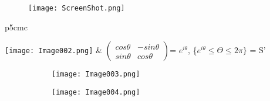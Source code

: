 \documentclass[11pt, oneside]{article}   	%
\begin{document}
\begin{Large}
\begin{figure}
  \texttt{[image: ScreenShot.png]}
\end{figure}

\begin{tabular}{p{5cm}c}

\texttt{[image: Image002.png]}
&
$\begin{pmatrix}
cos\theta & -sin\theta\\
sin\theta& cos\theta    
\end{pmatrix}$= $e^{i\theta}$, \{$e^{i\theta}$$\leq\Theta\leq2\pi\}$ = S'

\end{tabular}

\begin{figure}[h!]
  \centering
  \begin{subfigure}[b]{0.3\linewidth}
 \texttt{[image: Image003.png]}
  \end{subfigure}
 \begin{subfigure}[b]{0.6\linewidth}
    \texttt{[image: Image004.png]}
 
  \end{subfigure}
  
\end{figure}

\end{Large}
\end{document}
